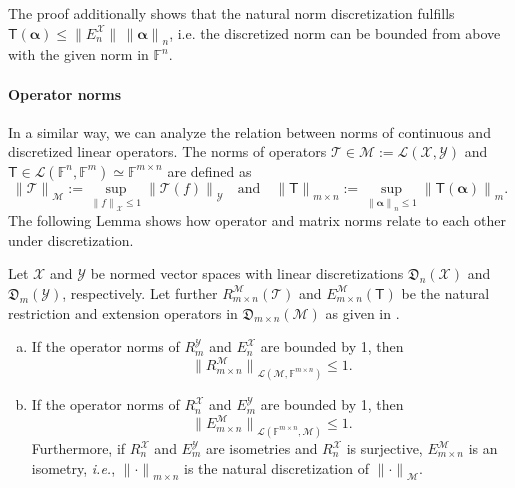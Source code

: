 \documentclass[a4paper]{paper}
\newcommand{\Discr}{\mathfrak{D}}
\newcommand{\Spc}[1]{\mathscr{#1}}
\newcommand{\Field}{\mathbb{F}}
\newcommand{\Op}[1]{\mathcal{#1}}
\newcommand{\DiscOp}[1]{\mathsf{#1}}
\newcommand*{\EXT}[2]{\ensuremath{E_{#1}^{#2}}}
\newcommand*{\REST}[2]{\ensuremath{R_{#1}^{#2}}}
\newcommand*{\RnX}{\ensuremath{\REST{n}{\Spc{X}}}}
\newcommand*{\RmY}{\ensuremath{\REST{m}{\Spc{Y}}}}
\newcommand*{\EnX}{\ensuremath{\EXT{n}{\Spc{X}}}}
\newcommand*{\EmY}{\ensuremath{\EXT{m}{\Spc{Y}}}}
\newcommand{\ie}{\textsl{i.e.}\xspace}
\newcommand{\valpha}{\boldsymbol{\alpha}}
\newcommand*{\NORM}[1]{\ensuremath{\lVert #1 \rVert}}
\begin{document}
\begin{remark}
 The proof additionally shows that the natural norm discretization fulfills
 $\DiscOp{T}(\valpha) \leq \NORM{\EnX}\, \NORM{\valpha}_n$, i.e. the discretized norm can be bounded from above 
 with the given norm in $\Field^n$.
\end{remark}


\paragraph{Operator norms}

In a similar way, we can analyze the relation between norms of continuous and discretized linear operators. 
The norms of operators $\Op{T} \in \Spc{M} := \Spc{L}(\Spc{X}, \Spc{Y})$ and 
$\DiscOp{T} \in \Spc{L}(\Field^n, \Field^m) \simeq \Field^{m\times n}$ are defined as
%
\begin{equation*}
 \NORM{\Op{T}}_{\Spc{M}} := \sup_{\NORM{f}_{\Spc{X}} \leq 1} \NORM{\Op{T}(f)}_{\Spc{Y}}
 \quad \text{and} \quad
 \NORM{\DiscOp{T}}_{m\times n} := \sup_{\NORM{\valpha}_n \leq 1} \NORM{\DiscOp{T}(\valpha)}_m.
\end{equation*}
%
The following Lemma shows how operator and matrix norms relate to each other under discretization.

\begin{lemma}
 \label{lemma:operator_norm_estimate}
 Let $\Spc{X}$ and $\Spc{Y}$ be normed vector spaces with linear discretizations $\Discr_n(\Spc{X})$ and 
 $\Discr_m(\Spc{Y})$, respectively. Let further $\REST{m\times n}{\Spc{M}}(\Op{T})$ and 
 $\EXT{m\times n}{\Spc{M}}(\DiscOp{T})$ be the natural restriction and extension operators in 
 $\Discr_{m\times n}(\Spc{M})$ as given in .
 \begin{enumerate}[(a)]
  \item \label{lemma:operator_norm_estimate:a_rest}
  If the operator norms of $\RmY$ and $\EnX$ are bounded by 1, then
  \begin{equation*}
   \NORM{R_{m\times n}^{\Spc{M}}}_{\Spc{L}(\Spc{M},\Field^{m\times n})} \leq 1.
  \end{equation*}
  \item \label{lemma:operator_norm_estimate:a_rest}
  If the operator norms of $\RnX$ and $\EmY$ are bounded by 1, then
  \begin{equation*}
   \NORM{E_{m\times n}^{\Spc{M}}}_{\Spc{L}(\Field^{m\times n}, \Spc{M})} \leq 1.
  \end{equation*}
  Furthermore, if $\RnX$ and $\EmY$ are isometries and $\RnX$ is surjective, $E_{m\times n}^{\Spc{M}}$ is an isometry, 
  \ie, $\NORM{\cdot}_{m\times n}$ is the natural discretization of $\NORM{\cdot}_{\Spc{M}}$.
 \end{enumerate}
\end{lemma}
\end{document}
